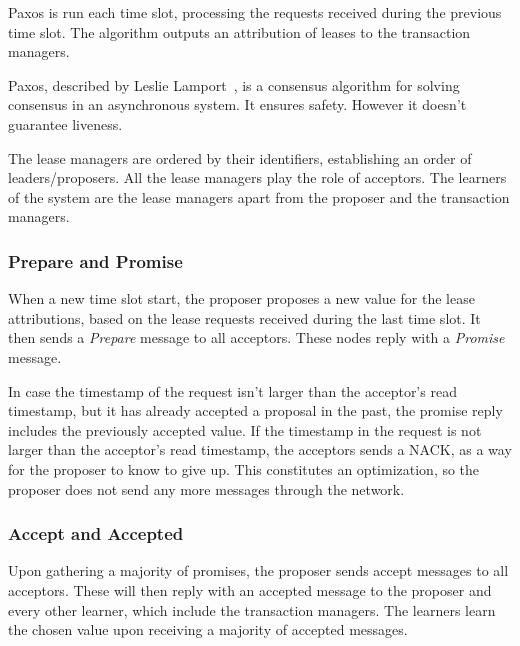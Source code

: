 \documentclass[times, 10pt,twocolumn]{article}
\begin{document}
Paxos is run each time slot, processing the requests received during the previous time slot. The algorithm outputs an attribution of leases to the transaction managers.


Paxos, described by Leslie Lamport~\cite{paxos}, is a consensus algorithm for solving consensus in an asynchronous system. It ensures safety. However it doesn't guarantee liveness.

The lease managers are ordered by their identifiers, establishing an order of leaders/proposers. All the lease managers play the role of acceptors. The learners of the system are the lease managers apart from the proposer and the transaction managers.

\subsubsection{Prepare and Promise}

When a new time slot start, the proposer proposes a new value for the lease attributions, based on the lease requests received during the last time slot. It then sends a \textit{Prepare} message to all acceptors. These nodes reply with a \textit{Promise} message. 

In case the timestamp of the request isn't larger than the acceptor's read timestamp, but it has already accepted a proposal in the past, the promise reply includes the previously accepted value. If the timestamp in the request is not larger than the acceptor's read timestamp, the acceptors sends a NACK, as a way for the proposer to know to give up. This constitutes an optimization, so the proposer does not send any more messages through the network.

\subsubsection{Accept and Accepted}

Upon gathering a majority of promises, the proposer sends accept messages to all acceptors. These will then reply with an accepted message to the proposer and every other learner, which include the transaction managers. The learners learn the chosen value upon receiving a majority of accepted messages.
\end{document}

